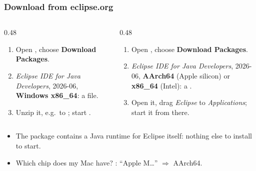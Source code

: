 \documentclass[aspectratio=169,10pt,compress]{beamer}
\begin{document}
\begin{frame}[t,fragile] \frametitle{Download from eclipse.org}
  \begin{columns}[T]
    \begin{column}{0.48\textwidth}
      \begin{block}{\win}
        \small
        \begin{enumerate}
          \item Open , choose \textbf{Download Packages}.
          \item \emph{Eclipse IDE for Java Developers}, 2026-06, \textbf{Windows x86\_64}: a  file.
          \item Unzip it, e.g.\ to ; start .
        \end{enumerate}
      \end{block}
    \end{column}
    \begin{column}{0.48\textwidth}
      \begin{block}{\mac}
        \small
        \begin{enumerate}
          \item Open , choose \textbf{Download Packages}.
          \item \emph{Eclipse IDE for Java Developers}, 2026-06, \textbf{AArch64} (Apple silicon) or \textbf{x86\_64} (Intel): a .
          \item Open it, drag \emph{Eclipse} to \emph{Applications}; start it from there.
        \end{enumerate}
      \end{block}
    \end{column}
  \end{columns}
  \begin{itemize}\small
    \item The package contains a Java runtime for Eclipse itself: nothing else to install to start.
    \item Which chip does my Mac have? : ``Apple M\dots'' $\Rightarrow$ AArch64.
  \end{itemize}
\end{frame}
\end{document}
